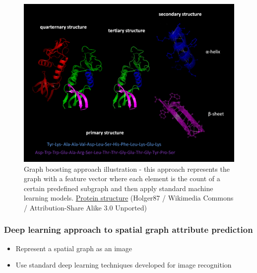 \documentclass{article}
\begin{document}
\begin{landscape}
\begin{figure}[H]\centering
	\includegraphics[width=\textwidth]{Proteins}
	\caption{
		Graph boosting approach illustration - this approach represents the graph with a feature vector where each element is the count of a certain predefined subgraph and then apply standard machine learning models.
		\href{https://commons.wikimedia.org/wiki/File:Protein_structure.png}
		{Protein structure}
		(Holger87 / Wikimedia Commons / Attribution-Share Alike 3.0 Unported)
	}
	\label{fig:proteins}
\end{figure}

\subsubsection{Deep learning approach to spatial graph attribute prediction}
\begin{itemize}
	\item Represent a spatial graph as an image
	\item Use standard deep learning techniques developed for image recognition
\end{itemize}


\end{landscape}
\end{document}

